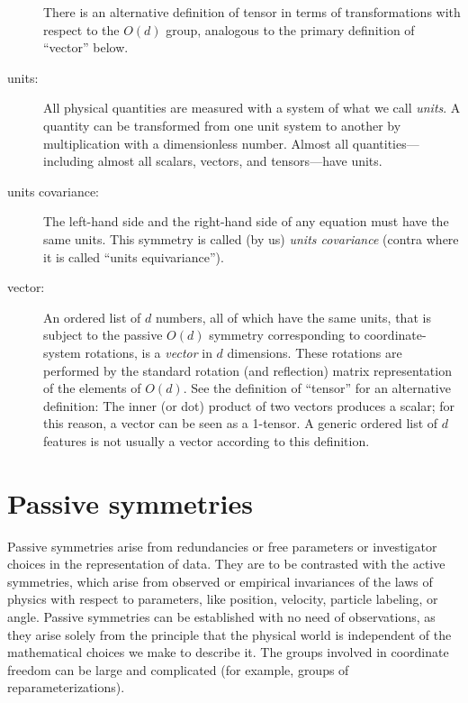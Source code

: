 \documentclass{article} %
\begin{document}
\begin{description}
  There is an alternative definition of tensor in terms of transformations with respect to the $O(d)$ group, analogous to the primary definition of ``vector'' below.
\item[units:]
  All physical quantities are measured with a system of what we call \emph{units}.
  A quantity can be transformed from one unit system to another by multiplication with a dimensionless number.
  Almost all quantities---including almost all scalars, vectors, and tensors---have units.
\item[units covariance:]
  The left-hand side and the right-hand side of any equation must have the same units.
  This symmetry is called (by us) \emph{units covariance} (contra \citealt{villar2022dimensionless} where it is called ``units equivariance'').
\item[vector:]
  An ordered list of $d$ numbers, all of which have the same units, that is subject to the passive $O(d)$ symmetry corresponding to coordinate-system rotations, is a \emph{vector} in $d$ dimensions.
  These rotations are performed by the standard rotation (and reflection) matrix representation of the elements of $O(d)$.
  See the definition of ``tensor'' for an alternative definition:
  The inner (or dot) product of two vectors produces a scalar; for this reason, a vector can be seen as a 1-tensor.
  A generic ordered list of $d$ features is not usually a vector according to this definition.
\end{description}

\section{Passive symmetries}\label{sec:informal}
Passive symmetries arise from redundancies or free parameters or investigator choices in the representation of data.
They are to be contrasted with the active symmetries, which arise from observed or empirical invariances of the laws of physics with respect to parameters, like position, velocity, particle labeling, or angle.
Passive symmetries can be established with no need of observations, as they arise solely from the principle that the physical world is independent of the mathematical choices we make to describe it.
The groups involved in coordinate freedom can be large and complicated (for example, groups of reparameterizations).
\end{document}
